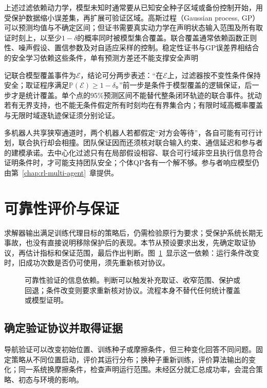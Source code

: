 上述过滤依赖动力学，模型未知时通常要从已知安全种子区域或备份控制开始，用受保护数据缩小误差集，再扩展可验证区域。高斯过程（Gaussian process, GP）可以预测均值与不确定区间；但证书需要真实动力学在声明状态输入范围及所有取证时刻上，以至少$1-\delta$的概率同时被模型集合覆盖。联合覆盖通常依赖函数正则性、噪声假设、置信参数及对自适应采样的控制。稳定性证书与GP误差界相结合的安全学习依赖这些条件，单有预测方差还不能支撑安全声明

记联合模型覆盖事件为$\mathcal E$，结论可分两步表述：“在$\mathcal E$上，过滤器按不变性条件保持安全；取证程序满足$\mathbb P(\mathcal E)\geq1-\delta$。”前一步是条件于模型覆盖的逻辑保证，后一步才是统计覆盖。单个点的95\%预测区间不能替代整条闭环轨迹的联合事件。扰动若有无界支持，也不能无条件假定所有时刻均在有界集合内；有限时域高概率覆盖与无限时域逐轨迹保证须分别论证。

多机器人共享狭窄通道时，两个机器人若都假定“对方会等待”，各自可能有可行计划，联合执行却会相撞。团队保证因而还须核对联合输入约束、通信延迟和参与者的建模承诺。去中心化过滤只有在局部假设相容、联合可行域非空且执行信息符合证明条件时，才可能支持团队安全；个体QP各有一个解不够。参与者响应模型仍由第~\ref{chap:rl-multi-agent}~章提供。

\section{可靠性评价与保证}
\label{sec:rl-trustworthy-evidence}

求解器输出满足训练代理目标的策略后，仍需检验原行为要求；受保护系统长期无事故，也没有直接说明移除保护后的表现。本节从预设要求出发，先确定取证协议，再估计指标和保证范围，最后作出判断。图~\ref{fig:rl-trustworthy-validation}~显示这一依赖：运行条件改变时，旧成功次数是否仍可使用，须先重新核对协议。

\begin{figure}[t]
  \centering
  
  \caption{可靠性验证的信息依赖。判断可以触发补充取证、收窄范围、保护或回退；条件改变则要求重新核对协议。流程本身不替代任何统计覆盖或模型证明。}
  \label{fig:rl-trustworthy-validation}
\end{figure}

\subsection{确定验证协议并取得证据}
\label{sec:rl-trustworthy-protocol}

导航验证可以改变初始位置、训练种子或摩擦条件，但三种变化回答不同问题。固定策略从不同位置启动，评价其运行分布；换种子重新训练，评价算法输出的变化；同一系统换摩擦条件，检查声明运行范围。未经区分就汇总成功率，会混合策略、初态与环境的影响。

